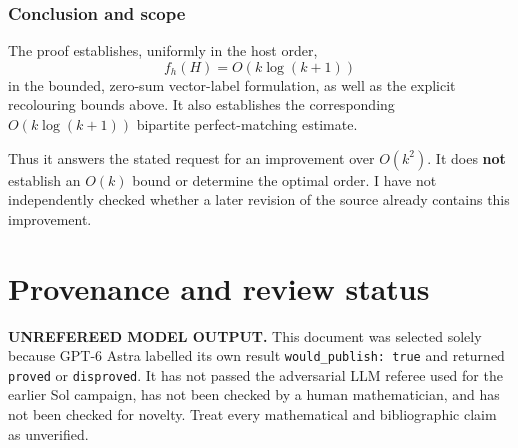 \documentclass[
  11pt,
  a4paper,
]{article}
\begin{document}
\subsubsection{Conclusion and scope}\label{conclusion-and-scope}

The proof establishes, uniformly in the host order, \[
\boxed{f_h(H)=O(k\log(k+1))}
\] in the bounded, zero-sum vector-label formulation, as well as the
explicit recolouring bounds above. It also establishes the corresponding
\(O(k\log(k+1))\) bipartite perfect-matching estimate.

Thus it answers the stated request for an improvement over \(O(k^2)\).
It does \textbf{not} establish an \(O(k)\) bound or determine the
optimal order. I have not independently checked whether a later revision
of the source already contains this improvement.

\appendix

\section{Provenance and review
status}\label{provenance-and-review-status}

\begin{warning}

\textbf{UNREFEREED MODEL OUTPUT.} This document was selected solely
because GPT-6 Astra labelled its own result
\texttt{would\_publish:\ true} and returned \texttt{proved} or
\texttt{disproved}. It has not passed the adversarial LLM referee used
for the earlier Sol campaign, has not been checked by a human
mathematician, and has not been checked for novelty. Treat every
mathematical and bibliographic claim as unverified.

\end{warning}
\end{document}
